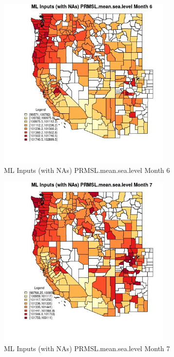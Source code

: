 \begin{figure} 
\centering  
\includegraphics[width=0.77\textwidth]{Code_Outputs/Report_ML_input_PM25_Step4_part_f_de_duplicated_aveswNAs_CountyPRMSLmeansealevelmedianMonth6.jpg} 
\caption{\label{fig:Report_ML_input_PM25_Step4_part_f_de_duplicated_aveswNAsCountyPRMSLmeansealevelmedianMonth6}ML Inputs (with NAs) PRMSL.mean.sea.level Month 6} 
\end{figure} 
 

\begin{figure} 
\centering  
\includegraphics[width=0.77\textwidth]{Code_Outputs/Report_ML_input_PM25_Step4_part_f_de_duplicated_aveswNAs_CountyPRMSLmeansealevelmedianMonth7.jpg} 
\caption{\label{fig:Report_ML_input_PM25_Step4_part_f_de_duplicated_aveswNAsCountyPRMSLmeansealevelmedianMonth7}ML Inputs (with NAs) PRMSL.mean.sea.level Month 7} 
\end{figure} 
 

